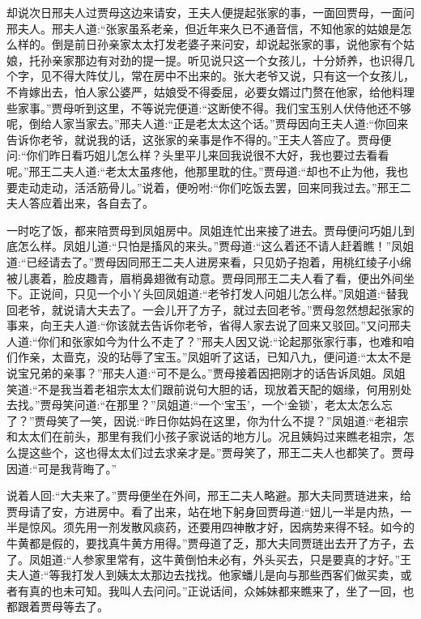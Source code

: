 \begin{parag}
    却说次日邢夫人过贾母这边来请安，王夫人便提起张家的事，一面回贾母，一面问邢夫人。邢夫人道:“张家虽系老亲，但近年来久已不通音信，不知他家的姑娘是怎么样的。倒是前日孙亲家太太打发老婆子来问安，却说起张家的事，说他家有个姑娘，托孙亲家那边有对劲的提一提。听见说只这一个女孩儿，十分娇养，也识得几个字，见不得大阵仗儿，常在房中不出来的。张大老爷又说，只有这一个女孩儿，不肯嫁出去，怕人家公婆严，姑娘受不得委屈，必要女婿过门赘在他家，给他料理些家事。”贾母听到这里，不等说完便道:“这断使不得。我们宝玉别人伏侍他还不够呢，倒给人家当家去。”邢夫人道:“正是老太太这个话。”贾母因向王夫人道:“你回来告诉你老爷，就说我的话，这张家的亲事是作不得的。”王夫人答应了。贾母便问:“你们昨日看巧姐儿怎么样？头里平儿来回我说很不大好，我也要过去看看呢。”邢王二夫人道:“老太太虽疼他，他那里耽的住。”贾母道:“却也不止为他，我也要走动走动，活活筋骨儿。”说着，便吩咐:“你们吃饭去罢，回来同我过去。”邢王二夫人答应着出来，各自去了。
\end{parag}


\begin{parag}
    一时吃了饭，都来陪贾母到凤姐房中。凤姐连忙出来接了进去。贾母便问巧姐儿到底怎么样。凤姐儿道:“只怕是搐风的来头。”贾母道:“这么着还不请人赶着瞧！”凤姐道:“已经请去了。”贾母因同邢王二夫人进房来看，只见奶子抱着，用桃红绫子小绵被儿裹着，脸皮趣青，眉梢鼻翅微有动意。贾母同邢王二夫人看了看，便出外间坐下。正说间，只见一个小丫头回凤姐道:“老爷打发人问姐儿怎么样。”凤姐道:“替我回老爷，就说请大夫去了。一会儿开了方子，就过去回老爷。”贾母忽然想起张家的事来，向王夫人道:“你该就去告诉你老爷，省得人家去说了回来又驳回。”又问邢夫人道:“你们和张家如今为什么不走了？”邢夫人因又说:“论起那张家行事，也难和咱们作亲，太啬克，没的玷辱了宝玉。”凤姐听了这话，已知八九，便问道:“太太不是说宝兄弟的亲事？”邢夫人道:“可不是么。”贾母接着因把刚才的话告诉凤姐。凤姐笑道:“不是我当着老祖宗太太们跟前说句大胆的话，现放着天配的姻缘，何用别处去找。”贾母笑问道:“在那里？”凤姐道:“一个‘宝玉’，一个‘金锁’，老太太怎么忘了？”贾母笑了一笑，因说:“昨日你姑妈在这里，你为什么不提？”凤姐道:“老祖宗和太太们在前头，那里有我们小孩子家说话的地方儿。况且姨妈过来瞧老祖宗，怎么提这些个，这也得太太们过去求亲才是。”贾母笑了，邢王二夫人也都笑了。贾母因道:“可是我背晦了。”
\end{parag}


\begin{parag}
    说着人回:“大夫来了。”贾母便坐在外间，邢王二夫人略避。那大夫同贾琏进来，给贾母请了安，方进房中。看了出来，站在地下躬身回贾母道:“妞儿一半是内热，一半是惊风。须先用一剂发散风痰药，还要用四神散才好，因病势来得不轻。如今的牛黄都是假的，要找真牛黄方用得。”贾母道了乏，那大夫同贾琏出去开了方子，去了。凤姐道:“人参家里常有，这牛黄倒怕未必有，外头买去，只是要真的才好。”王夫人道:“等我打发人到姨太太那边去找找。他家蟠儿是向与那些西客们做买卖，或者有真的也未可知。我叫人去问问。”正说话间，众姊妹都来瞧来了，坐了一回，也都跟着贾母等去了。
\end{parag}


